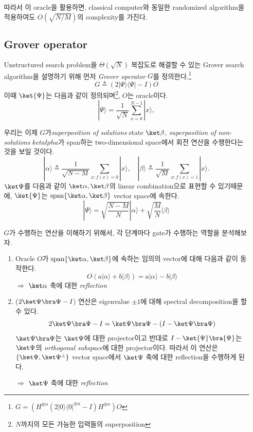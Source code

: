따라서 이 oracle을 활용하면, classical computer와 동일한 randomized algorithm을 적용하여도 $O(\sqrt{N/M})$의 complexity를 가진다.


\subsection{Grover operator}
Unstructured search problem을 $\Theta(\sqrt N)$ 복잡도로 해결할 수 있는 Grover search algorithm을 설명하기 위해 먼저 \textit{Grover operator} $G$를 정의한다.\footnote{$G = (H^{\otimes n}(2|0\rangle\langle 0|^{\otimes n}-I) H^{\otimes n})O$}
\begin{equation*}
  G \triangleq (2|\Psi\rangle\langle\Psi|-I) O
\end{equation*}
이때 $\ket{\Psi}$는 다음과 같이 정의되며\footnote{$N$까지의 모든 가능한 입력들의 superposition}, $O$는 oracle이다.
\begin{equation*}
  |\Psi\rangle=\frac{1}{\sqrt{N}} \sum_{x=0}^{N-1}|x\rangle,
\end{equation*}

우리는 이제 $G$가\textit{superposition of solutions} state $\ket \beta$, \textit{superposition of non-solutions} $ket alpha$가 span하는 two-dimensional space에서 회전 연산을 수행한다는 것을 보일 것이다.
\begin{equation}
  |\alpha\rangle \triangleq \frac{1}{\sqrt{N-M}} \sum_{x: f(x) = 0}|x\rangle, \quad|\beta\rangle \triangleq \frac{1}{\sqrt{M}} \sum_{x: f(x) = 1}|x\rangle . \label{def:solution-state}
\end{equation}
$\ket \Psi$를 다음과 같이 $\ket \alpha, \ket \beta$의 linear combination으로 표현할 수 있기때문에, $\ket{\Psi}$는 $\text{span}\{\ket \alpha, \ket \beta \}$ vector space에 속한다. 
\begin{equation*}
  |\Psi\rangle=\sqrt{\frac{N-M}{N}}|\alpha\rangle+\sqrt{\frac{M}{N}}|\beta\rangle
\end{equation*}

$G$가 수행하는 연산을 이해하기 위해서, 각 단계마다 gate가 수행하는 역할을 분석해보자.
\begin{enumerate}
  \item Oracle $O$가 $\text{span}\{\ket \alpha, \ket \beta \}$에 속하는 임의의 vector에 대해 다음과 같이 동작한다.
  \begin{equation*}
    O(a|\alpha\rangle+b|\beta\rangle)=a|\alpha\rangle-b|\beta\rangle
  \end{equation*}
  $\Rightarrow$ $\ket \alpha$ 축에 대한 \textit{reflection}
  \item ($2 \ket \Psi \bra \Psi - I$) 연산은 eigenvalue $\pm 1$에 대해 spectral decomposition을 할 수 있다.
  \begin{equation*}
    2 \ket \Psi \bra \Psi - I = \ket \Psi \bra \Psi  - (I - \ket \Psi \bra \Psi)
  \end{equation*}
  $\ket \Psi \bra \Psi$는 $\ket \Psi$에 대한 projector이고 반대로 $I - \ket{\Psi} \bra{\Psi}$는 $\ket \Psi$의 \textit{orthogonal subspace}에 대한 projector이다.
  따라서 이 연산은 $\{\ket \Psi, \ket \Psi^\perp\}$ vector space에서 $\ket \Psi$ 축에 대한 reflection을 수행하게 된다. 
  
  $\Rightarrow$ $\ket \Psi$ 축에 대한 \textit{reflection}
\end{enumerate}

